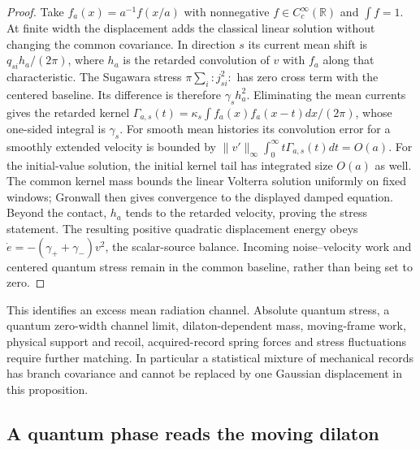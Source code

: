 \documentclass[12pt,a4paper]{article}
\begin{document}
\begin{proof}
Take $f_a(x)=a^{-1}f(x/a)$ with nonnegative $f\in C_c^\infty(\mathbb R)$
and $\int f=1$. At finite width the displacement adds the classical
linear solution without changing the common covariance. In direction $s$
its current mean shift is $q_{si}h_a/(2\pi)$, where $h_a$ is the retarded
convolution of $v$ with $f_a$ along that characteristic. The Sugawara
stress $\pi\sum_i:j_{si}^2:$ has zero cross term with the centered
baseline. Its difference is therefore $\gamma_s h_a^2$.
Eliminating the mean currents gives the retarded kernel
$\Gamma_{a,s}(t)=\kappa_s\int f_a(x)f_a(x-t)dx/(2\pi)$, whose
one-sided integral is $\gamma_s$. For smooth mean histories its
convolution error for a smoothly extended velocity is bounded by
$\|v'\|_\infty\int_0^\infty t\Gamma_{a,s}(t)dt=O(a)$.
For the initial-value solution, the initial kernel tail has integrated
size $O(a)$ as well. The common kernel mass bounds the linear Volterra
solution uniformly on fixed windows; Gronwall then gives convergence
to the displayed damped equation. Beyond the contact, $h_a$ tends to
the retarded velocity, proving the stress statement. The resulting
positive quadratic displacement energy obeys
$\dot e=-(\gamma_++\gamma_-)v^2$, the scalar-source balance.
Incoming noise--velocity work and centered quantum stress remain in
the common baseline, rather than being set to zero.
\end{proof}

This identifies an excess mean radiation channel. Absolute quantum
stress, a quantum zero-width channel limit, dilaton-dependent mass,
moving-frame work, physical support and recoil, acquired-record spring
forces and stress fluctuations require further matching. In particular
a statistical mixture of mechanical records has branch covariance
and cannot be replaced by one Gaussian displacement in this proposition.

\subsection{A quantum phase reads the moving dilaton}
\label{sec:material-dilaton-probe}
\end{document}
